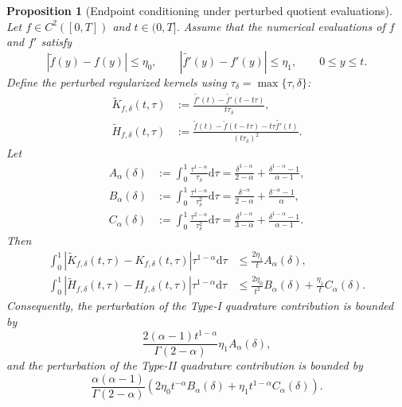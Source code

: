 \documentclass[preprint,3p,times]{elsarticle}
\newcommand{\abs}[1]{\left\lvert #1\right\rvert}
\newtheorem{proposition}{Proposition}[section]
\def\d{\mathrm{d}}
\begin{document}
\begin{proposition}[Endpoint conditioning under perturbed quotient evaluations]
\label{prop:delta-conditioning}
Let $f\in C^2([0,T])$ and $t\in(0,T]$. Assume that the numerical evaluations of $f$ and $f'$ satisfy
\begin{equation}\label{eqn:eval-perturbation}
    \abs{\widetilde f(y)-f(y)}\le \eta_0,
    \qquad
    \abs{\widetilde {f'}(y)-f'(y)}\le \eta_1,
    \qquad 0\le y\le t .
\end{equation}
Define the perturbed regularized kernels using $\tau_\delta=\max\{\tau,\delta\}$:
\begin{align*}
    \widetilde K_{f,\delta}(t,\tau)
    &:=\frac{\widetilde {f'}(t)-\widetilde {f'}(t-t\tau)}{t\tau_\delta},\\
    \widetilde H_{f,\delta}(t,\tau)
    &:=\frac{\widetilde f(t)-\widetilde f(t-t\tau)-t\tau\widetilde {f'}(t)}{(t\tau_\delta)^2}.
\end{align*}
Let
\begin{align}
    A_\alpha(\delta)
    &:=\int_0^1\frac{\tau^{1-\alpha}}{\tau_\delta}\d\tau
      =\frac{\delta^{1-\alpha}}{2-\alpha}
       +\frac{\delta^{1-\alpha}-1}{\alpha-1},\label{eqn:A-delta}\\
    B_\alpha(\delta)
    &:=\int_0^1\frac{\tau^{1-\alpha}}{\tau_\delta^2}\d\tau
      =\frac{\delta^{-\alpha}}{2-\alpha}
       +\frac{\delta^{-\alpha}-1}{\alpha},\label{eqn:B-delta}\\
    C_\alpha(\delta)
    &:=\int_0^1\frac{\tau^{2-\alpha}}{\tau_\delta^2}\d\tau
      =\frac{\delta^{1-\alpha}}{3-\alpha}
       +\frac{\delta^{1-\alpha}-1}{\alpha-1}.\label{eqn:C-delta}
\end{align}
Then
\begin{align}
\int_0^1
\abs{\widetilde K_{f,\delta}(t,\tau)-K_{f,\delta}(t,\tau)}\tau^{1-\alpha}\d\tau
&\le \frac{2\eta_1}{t}A_\alpha(\delta),\label{eqn:K-noise-bound}\\
\int_0^1
\abs{\widetilde H_{f,\delta}(t,\tau)-H_{f,\delta}(t,\tau)}\tau^{1-\alpha}\d\tau
&\le \frac{2\eta_0}{t^2}B_\alpha(\delta)+\frac{\eta_1}{t}C_\alpha(\delta).
\label{eqn:H-noise-bound}
\end{align}
Consequently, the perturbation of the Type-I quadrature contribution is bounded by
\begin{equation}\label{eqn:op-noise-I}
\frac{2(\alpha-1)t^{1-\alpha}}{\Gamma(2-\alpha)}\eta_1A_\alpha(\delta),
\end{equation}
and the perturbation of the Type-II quadrature contribution is bounded by
\begin{equation}\label{eqn:op-noise-II}
\frac{\alpha(\alpha-1)}{\Gamma(2-\alpha)}
\left(2\eta_0t^{-\alpha}B_\alpha(\delta)+\eta_1t^{1-\alpha}C_\alpha(\delta)\right).
\end{equation}
\end{proposition}
\end{document}
